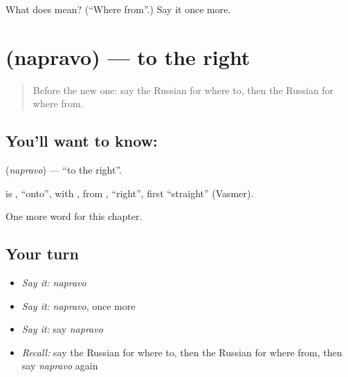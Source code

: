 \begin{tcolorbox}[breakable,colback=teal!4,colframe=teal!35!black,title={Before you move on}]
What does  mean? (\textquotedblleft{}Where from\textquotedblright{}.) Say it once more.
\end{tcolorbox}
\section[\texorpdfstring{\ru{направо} (napravo)}{направо (napravo)}]{ (napravo) — to the right}

\label{lesson:RU-C86-to-the-right}



\begin{quote}
Before the new one: say the Russian for where to, then the Russian for where from.
\end{quote}

\subsection*{You'll want to know: }
\textbf{} (\emph{napravo}) — \textquotedblleft{}to the right\textquotedblright{}.

\begin{cousinweb}
\textbf{} is \emph{}, \textquotedblleft{}onto\textquotedblright{}, with \emph{}, from \emph{}, \textquotedblleft{}right\textquotedblright{}, first \textquotedblleft{}straight\textquotedblright{} (Vasmer).
\end{cousinweb}

\begin{grammarlens}[title={What you've built}]
One more word for this chapter.
\end{grammarlens}

\subsection*{Your turn}
\begin{itemize}
\raggedright
  \item \emph{Say it:} \emph{napravo}
  \item \emph{Say it:} \emph{napravo}, once more
  \item \emph{Say it:} say \emph{napravo}
  \item \emph{Recall:} say the Russian for where to, then the Russian for where from, then say \emph{napravo} again
\end{itemize}

